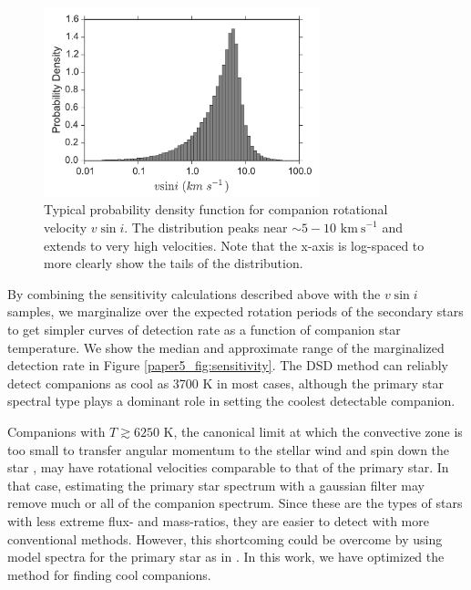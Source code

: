 \begin{figure}
    \centering
    \includegraphics[width=80mm]{Figures/paper5_vsini_PDF.pdf}
    \caption{Typical probability density function for companion rotational velocity $v\sin{i}$. The distribution peaks near $\sim 5-10$ $\mathrm{km\ s}^{-1}$ and extends to very high velocities. Note that the x-axis is log-spaced to more clearly show the tails of the distribution.}
    \label{paper5_fig:vsini}
\end{figure}

By combining the sensitivity calculations described above with the $v\sin{i}$ samples, we marginalize over the expected rotation periods of the secondary stars to get simpler curves of detection rate as a function of companion star temperature. We show the median and approximate range of the marginalized detection rate in Figure \ref{paper5_fig:sensitivity}. The DSD method can reliably detect companions as cool as 3700 K in most cases, although the primary star spectral type plays a dominant role in setting the coolest detectable companion. 

Companions with $T \gtrsim 6250$ K, the canonical limit at which the convective zone is too small to transfer angular momentum to the stellar wind and spin down the star \citep{Pinsonneault2001}, may have rotational velocities comparable to that of the primary star. In that case, estimating the primary star spectrum with a gaussian filter may remove much or all of the companion spectrum. Since these are the types of stars with less extreme flux- and mass-ratios, they are easier to detect with more conventional methods. However, this shortcoming could be overcome by using model spectra for the primary star as in \citet{Kolbl2015}. In this work, we have optimized the method for finding cool companions.


